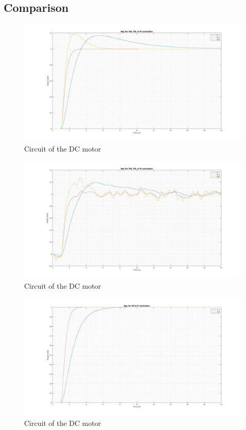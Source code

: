 \subsection{Comparison}

\begin{figure}[H]
\centering
\includegraphics[scale=0.2]{figures/Comp_NoNoise.jpg}
\caption{Circuit of the DC motor}
\label{dcmotor_circuit}
\end{figure}


\begin{figure}[H]
\centering
\includegraphics[scale=0.2]{figures/Comp_Noise.jpg}
\caption{Circuit of the DC motor}
\label{dcmotor_circuit}
\end{figure}


\begin{figure}[H]
\centering
\includegraphics[scale=0.2]{figures/PD_P_NoNooise.jpg}
\caption{Circuit of the DC motor}
\label{dcmotor_circuit}
\end{figure}


